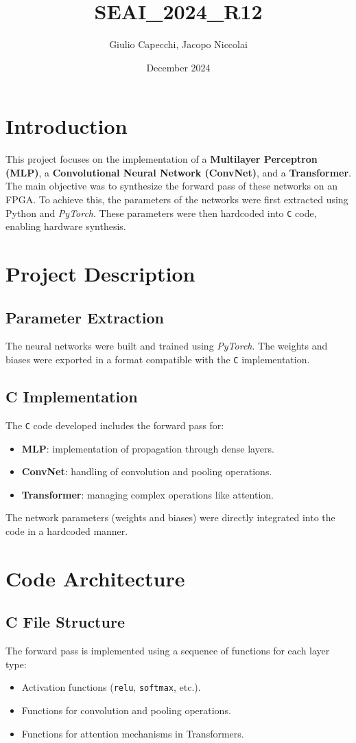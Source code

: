 \documentclass{article}
\title{SEAI\_2024\_R12}
\author{Giulio Capecchi, Jacopo Niccolai}
\date{December 2024}
\begin{document}
\maketitle


\section{Introduction}
This project focuses on the implementation of a \textbf{Multilayer Perceptron (MLP)}, 
a \textbf{Convolutional Neural Network (ConvNet)}, and a \textbf{Transformer}. The main objective was to synthesize the forward pass of these networks on an FPGA.
To achieve this, the parameters of the networks were first extracted using Python and \textit{PyTorch}. These parameters were then hardcoded into \texttt{C} code, enabling hardware synthesis.

\section{Project Description}
\subsection{Parameter Extraction}
The neural networks were built and trained using \textit{PyTorch}. The weights and biases were exported in a format compatible with the \texttt{C} implementation.

\subsection{C Implementation}
The \texttt{C} code developed includes the forward pass for:
\begin{itemize}
    \item \textbf{MLP}: implementation of propagation through dense layers.
    \item \textbf{ConvNet}: handling of convolution and pooling operations.
    \item \textbf{Transformer}: managing complex operations like attention.
\end{itemize}

The network parameters (weights and biases) were directly integrated into the code in a hardcoded manner.

\section{Code Architecture}
\subsection{C File Structure}
The forward pass is implemented using a sequence of functions for each layer type:
\begin{itemize}
    \item Activation functions (\texttt{relu}, \texttt{softmax}, etc.).
    \item Functions for convolution and pooling operations.
    \item Functions for attention mechanisms in Transformers.
\end{itemize}
\end{document}
